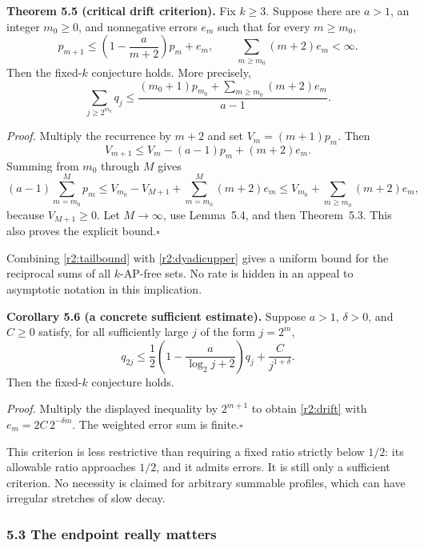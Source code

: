 \medskip
\noindent\textbf{Theorem 5.5 (critical drift criterion).}
Fix $k\ge3$. Suppose there are $a>1$, an integer $m_0\ge0$, and nonnegative errors $e_m$ such that for every $m\ge m_0$,
\begin{equation}\label{r2:drift}
p_{m+1}\le\left(1-\frac{a}{m+2}\right)p_m+e_m,
\qquad
\sum_{m\ge m_0}(m+2)e_m<\infty.
\end{equation}
Then the fixed-$k$ conjecture holds. More precisely,
\begin{equation}\label{r2:tailbound}
\sum_{j\ge2^{m_0}}q_j
\le\frac{(m_0+1)p_{m_0}+\sum_{m\ge m_0}(m+2)e_m}{a-1}.
\end{equation}

\noindent\emph{Proof.}
Multiply the recurrence by $m+2$ and set $V_m=(m+1)p_m$. Then
\[
V_{m+1}\le V_m-(a-1)p_m+(m+2)e_m.
\]
Summing from $m_0$ through $M$ gives
\[
(a-1)\sum_{m=m_0}^{M}p_m
\le V_{m_0}-V_{M+1}+\sum_{m=m_0}^{M}(m+2)e_m
\le V_{m_0}+\sum_{m\ge m_0}(m+2)e_m,
\]
because $V_{M+1}\ge0$. Let $M\to\infty$, use Lemma~5.4, and then Theorem~5.3. This also proves the explicit bound.\hfill$\square$

Combining \eqref{r2:tailbound} with \eqref{r2:dyadicupper} gives a uniform bound for the reciprocal sums of all $k$-AP-free sets. No rate is hidden in an appeal to asymptotic notation in this implication.

\medskip
\noindent\textbf{Corollary 5.6 (a concrete sufficient estimate).}
Suppose $a>1$, $\delta>0$, and $C\ge0$ satisfy, for all sufficiently large $j$ of the form $j=2^m$,
\begin{equation}\label{r2:target}
q_{2j}\le\frac12\left(1-\frac{a}{\log_2j+2}\right)q_j
+\frac{C}{j^{1+\delta}}.
\end{equation}
Then the fixed-$k$ conjecture holds.

\noindent\emph{Proof.}
Multiply the displayed inequality by $2^{m+1}$ to obtain \eqref{r2:drift} with $e_m=2C\,2^{-\delta m}$. The weighted error sum is finite.\hfill$\square$

This criterion is less restrictive than requiring a fixed ratio strictly below $1/2$: its allowable ratio approaches $1/2$, and it admits errors. It is still only a sufficient criterion. No necessity is claimed for arbitrary summable profiles, which can have irregular stretches of slow decay.

\subsubsection{5.3 The endpoint really matters}


